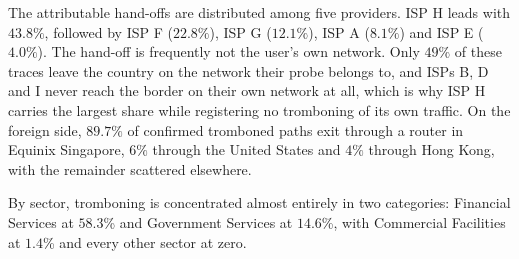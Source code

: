 \documentclass[sigconf,anonymous,10pt]{acmart}
\begin{document}
The attributable hand-offs are distributed among five providers. ISP H leads with $43.8\%$, followed by ISP F ($22.8\%$), ISP G ($12.1\%$), ISP A ($8.1\%$) and ISP E ($4.0\%$). The hand-off is frequently not the user's own network. Only $49\%$ of these traces leave the country on the network their probe belongs to, and ISPs B, D and I never reach the border on their own network at all, which is why ISP H carries the largest share while registering no tromboning of its own traffic. On the foreign side, $89.7\%$ of confirmed tromboned paths exit through a router in Equinix Singapore, $6\%$ through the United States and $4\%$ through Hong Kong, with the remainder scattered elsewhere.


By sector, tromboning is concentrated almost entirely in two categories: Financial Services at $58.3$\% and Government Services at $14.6$\%, with Commercial Facilities at $1.4$\% and every other sector at zero.

\end{document}
